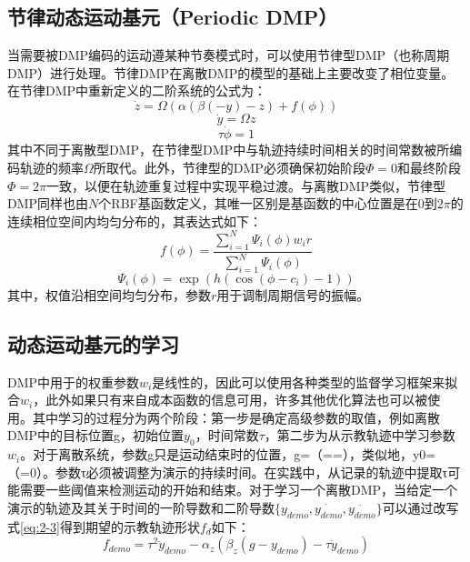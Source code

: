 \subsection{节律动态运动基元（Periodic DMP）}
当需要被DMP编码的运动遵某种节奏模式时，可以使用节律型DMP（也称周期DMP）进行处理。节律DMP在离散DMP的模型的基础上主要改变了相位变量。在节律DMP中重新定义的二阶系统的公式为：
\begin{equation}
    \dot{z}=\Omega(\alpha(\beta(-y)-z)+f(\phi))
    \label{eq:2-8}
\end{equation}
\begin{equation}
    \dot{y}=\Omega z
    \label{eq:2-9}
\end{equation}
\begin{equation}
    \tau \dot{\phi}=1
    \label{eq:2-10}
\end{equation}
其中不同于离散型DMP，在节律型DMP中与轨迹持续时间相关的时间常数被所编码轨迹的频率$\Omega$所取代。此外，节律型的DMP必须确保初始阶段$\Phi = 0$和最终阶段$\Phi = 2\pi$一致，以便在轨迹重复过程中实现平稳过渡。与离散DMP类似，节律型DMP同样也由$N$个RBF基函数定义，其唯一区别是基函数的中心位置是在0到$2\pi$的连续相位空间内均匀分布的，其表达式如下：
\begin{equation}
    f(\phi)=\frac{\sum_{i=1}^N \Psi_i(\phi) w_i r}{\sum_{i=1}^N \Psi_i(\phi)}
    \label{eq:2-11}
\end{equation}
\begin{equation}
    \Psi_i(\phi)=\exp \left(h\left(\cos \left(\phi-c_i\right)-1\right)\right)
    \label{eq:2-12}
\end{equation}
其中，权值沿相空间均匀分布，参数$r$用于调制周期信号的振幅。
\subsection{动态运动基元的学习}
DMP中用于的权重参数$w_i$是线性的，因此可以使用各种类型的监督学习框架来拟合$w_i$，此外如果只有来自成本函数的信息可用，许多其他优化算法也可以被使用。其中学习的过程分为两个阶段：第一步是确定高级参数的取值，例如离散DMP中的目标位置g，初始位置$y_0$，时间常数$τ$，第二步为从示教轨迹中学习参数$w_i$。对于离散系统，参数g只是运动结束时的位置，g=（==），类似地，y0=（=0）。参数τ必须被调整为演示的持续时间。在实践中，从记录的轨迹中提取τ可能需要一些阈值来检测运动的开始和结束。对于学习一个离散DMP，当给定一个演示的轨迹及其关于时间的一阶导数和二阶导数$\{y_{demo},\dot{y_{demo}},\ddot{y_{demo}} \}$可以通过改写式\ref{eq:2-3}得到期望的示教轨迹形状$f_d$如下：
\begin{equation}
    f_{demo}=\tau^2 \ddot{y}_{demo}-\alpha_z\left(\beta_z\left(g-y_{demo}\right)-\tau \dot{y}_{demo}\right)
\end{equation}